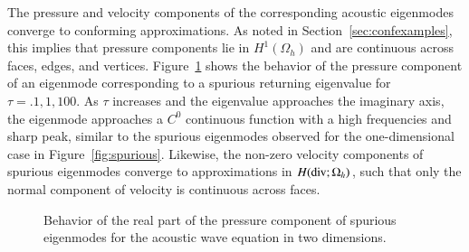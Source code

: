 \documentclass[preprint,10pt]{elsarticle}
\newcommand{\Oh}{\Omega_h}
\begin{document}
The pressure and velocity components of the corresponding acoustic eigenmodes converge to conforming approximations.  As noted in Section~\ref{sec:confexamples}, this implies that pressure components lie in $H^1(\Oh)$ and are continuous across faces, edges, and vertices.  Figure~\ref{fig:trackModesWave} shows the behavior of the pressure component of an eigenmode corresponding to a spurious returning eigenvalue for $\tau = .1, 1, 100$.  As $\tau$ increases and the eigenvalue approaches the imaginary axis, the eigenmode approaches a $C^0$ continuous function with a high frequencies and sharp peak, similar to the spurious eigenmodes observed for the one-dimensional case in Figure~\ref{fig:spurious}.  Likewise, the non-zero velocity components of spurious eigenmodes converge to approximations in $H({\rm div}; \Oh)$, such that only the normal component of velocity is continuous across faces.  



\begin{figure}
\centering
{}
\hspace{.5em}
\hspace{.5em}
\caption{Behavior of the real part of the pressure component of spurious eigenmodes for the acoustic wave equation in two dimensions.  }
\label{fig:trackModesWave}
\end{figure}
\end{document}
